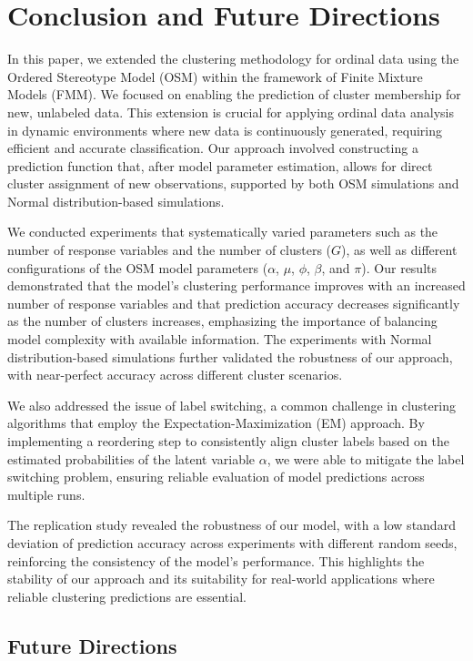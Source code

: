 \documentclass{article}
\begin{document}
\section{Conclusion and Future Directions}

In this paper, we extended the clustering methodology for ordinal data using the Ordered Stereotype Model (OSM) within the framework of Finite Mixture Models (FMM). We focused on enabling the prediction of cluster membership for new, unlabeled data. This extension is crucial for applying ordinal data analysis in dynamic environments where new data is continuously generated, requiring efficient and accurate classification. Our approach involved constructing a prediction function that, after model parameter estimation, allows for direct cluster assignment of new observations, supported by both OSM simulations and Normal distribution-based simulations.

We conducted experiments that systematically varied parameters such as the number of response variables and the number of clusters (\( G \)), as well as different configurations of the OSM model parameters (\(\alpha\), \(\mu\), \(\phi\), \(\beta\), and \(\pi\)). Our results demonstrated that the model's clustering performance improves with an increased number of response variables and that prediction accuracy decreases significantly as the number of clusters increases, emphasizing the importance of balancing model complexity with available information. The experiments with Normal distribution-based simulations further validated the robustness of our approach, with near-perfect accuracy across different cluster scenarios.

We also addressed the issue of label switching, a common challenge in clustering algorithms that employ the Expectation-Maximization (EM) approach. By implementing a reordering step to consistently align cluster labels based on the estimated probabilities of the latent variable \(\alpha\), we were able to mitigate the label switching problem, ensuring reliable evaluation of model predictions across multiple runs.

The replication study revealed the robustness of our model, with a low standard deviation of prediction accuracy across experiments with different random seeds, reinforcing the consistency of the model's performance. This highlights the stability of our approach and its suitability for real-world applications where reliable clustering predictions are essential.

\subsection{Future Directions}
\end{document}
